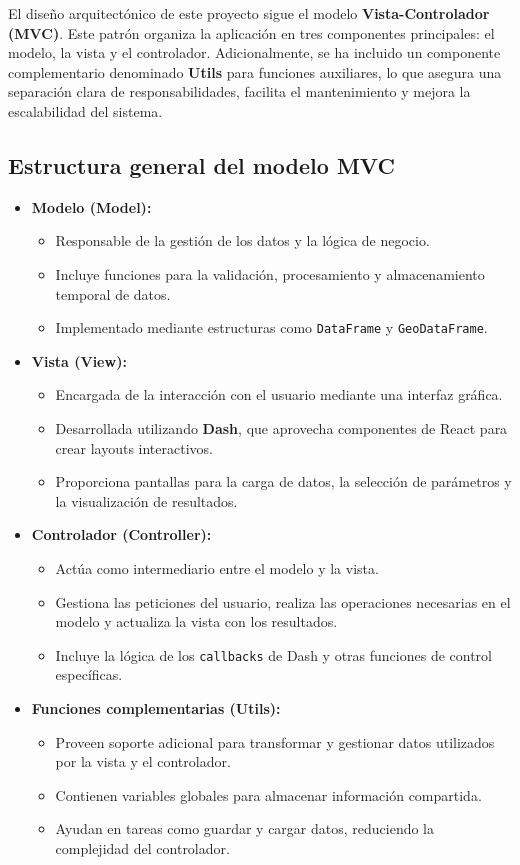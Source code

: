 El diseño arquitectónico de este proyecto sigue el modelo \textbf{Vista-Controlador (MVC)}. Este patrón organiza la aplicación en tres componentes principales: el modelo, la vista y el controlador. Adicionalmente, se ha incluido un componente complementario denominado \textbf{Utils} para funciones auxiliares, lo que asegura una separación clara de responsabilidades, facilita el mantenimiento y mejora la escalabilidad del sistema.

\subsection{Estructura general del modelo MVC}

\begin{itemize}
    \item \textbf{Modelo (Model):}
    \begin{itemize}
        \item Responsable de la gestión de los datos y la lógica de negocio.
        \item Incluye funciones para la validación, procesamiento y almacenamiento temporal de datos.
        \item Implementado mediante estructuras como \texttt{DataFrame} y \texttt{GeoDataFrame}.
    \end{itemize}
    \item \textbf{Vista (View):}
    \begin{itemize}
        \item Encargada de la interacción con el usuario mediante una interfaz gráfica.
        \item Desarrollada utilizando \textbf{Dash}, que aprovecha componentes de React para crear layouts interactivos.
        \item Proporciona pantallas para la carga de datos, la selección de parámetros y la visualización de resultados.
    \end{itemize}
    \item \textbf{Controlador (Controller):}
    \begin{itemize}
        \item Actúa como intermediario entre el modelo y la vista.
        \item Gestiona las peticiones del usuario, realiza las operaciones necesarias en el modelo y actualiza la vista con los resultados.
        \item Incluye la lógica de los \texttt{callbacks} de Dash y otras funciones de control específicas.
    \end{itemize}
    \item \textbf{Funciones complementarias (Utils):}
    \begin{itemize}
        \item Proveen soporte adicional para transformar y gestionar datos utilizados por la vista y el controlador.
        \item Contienen variables globales para almacenar información compartida.
        \item Ayudan en tareas como guardar y cargar datos, reduciendo la complejidad del controlador.
    \end{itemize}
\end{itemize}

